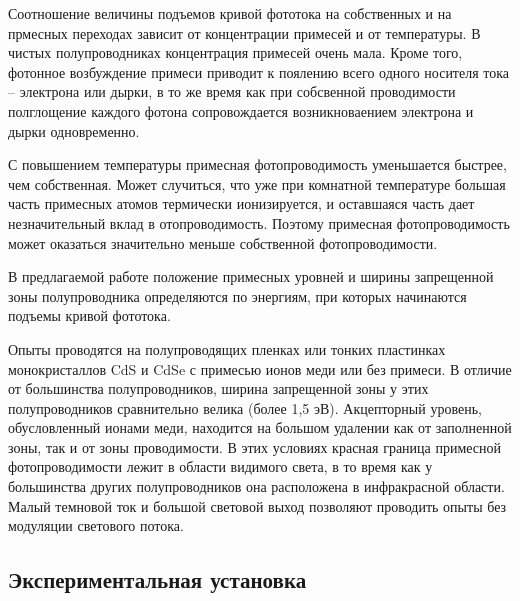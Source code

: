 \documentclass[a4paper, 12pt]{article}
\begin{document}
	Соотношение величины подъемов кривой фототока на собственных и на прмесных переходах зависит от концентрации примесей и от температуры. В чистых полупроводниках концентрация примесей очень мала. Кроме того, фотонное возбуждение примеси приводит к поялению всего одного носителя тока -- электрона или дырки, в то же время как при собсвенной проводимости полглощение каждого фотона сопровождается возникноваением электрона и дырки одновременно.

	С повышением температуры примесная фотопроводимость уменьшается быстрее, чем собственная. Может случиться, что уже при комнатной температуре большая часть примесных атомов термически ионизируется, и оставшаяся часть дает незначительный вклад в отопроводимость. Поэтому примесная фотопроводимость может оказаться значительно меньше собственной фотопроводимости.

	В предлагаемой работе положение примесных уровней и ширины запрещенной зоны полупроводника определяются по энергиям, при которых начинаются подъемы кривой фототока.

	Опыты проводятся на полупроводящих пленках или тонких пластинках монокристаллов CdS и CdSe с примесью ионов меди или без примеси. В отличие от большинства полупроводников, ширина запрещенной зоны у этих полупроводников сравнительно велика (более 1,5 эВ). Акцепторный уровень, обусловленный ионами меди, находится на большом удалении как от заполненной зоны, так и от зоны проводимости. В этих условиях красная граница примесной фотопроводимости лежит в области видимого света, в то время как у большинства других полупроводников она расположена в инфракрасной  области. Малый темновой ток и большой световой выход позволяют проводить опыты без модуляции светового потока.

	\subsection{Экспериментальная установка}
	
\end{document}
